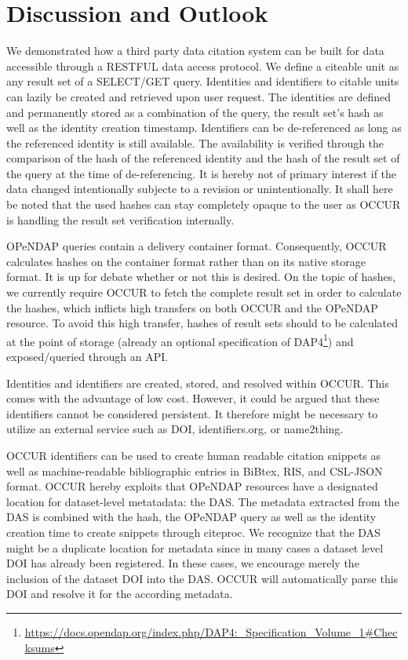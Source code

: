 \documentclass[letterpaper, twocolumn, parskip=half, fontsize=8pt, DIV=calc]{scrartcl}
\begin{document}
\section{Discussion and Outlook}
We demonstrated how a third party data citation system can be built for data accessible through a RESTFUL data access protocol. 
We define a citeable unit as any result set of a SELECT/GET query. 
Identities and identifiers to citable units can lazily be created and retrieved upon user request. 
The identities are defined and permanently stored as a combination of the query, the result set's hash as well as the identity creation timestamp.
Identifiers can be de-referenced as long as the referenced identity is still available.
The availability is verified through the comparison of the hash of the referenced identity and the hash of the result set of the query at the time of de-referencing. It is hereby not of primary interest if the data changed intentionally subjecte to a revision or unintentionally. It shall here be noted that the used hashes can stay completely opaque to the user as OCCUR is handling the result set verification internally. 

OPeNDAP queries contain a delivery container format. Consequently, OCCUR calculates hashes on the container format rather than on its native storage format. It is up for debate whether or not this is desired. On the topic of hashes, we currently require OCCUR to fetch the complete result set in order to calculate the hashes, which inflicts high transfers on both OCCUR and the OPeNDAP resource. To avoid this high transfer, hashes of result sets should to be calculated at the point of storage (already an optional specification of DAP4\footnote{\url{https://docs.opendap.org/index.php/DAP4:_Specification_Volume_1\#Checksums}}) and exposed/queried through an API.

Identities and identifiers are created, stored, and resolved within OCCUR. This comes with the advantage of low cost. However, it could be argued that these identifiers cannot be considered persistent. It therefore might be necessary to utilize an external service such as DOI, identifiers.org, or name2thing.

OCCUR identifiers can be used to create human readable citation snippets as well as machine-readable bibliographic entries in BiBtex, RIS, and CSL-JSON format. OCCUR hereby exploits that OPeNDAP resources have a designated location for dataset-level metatadata: the DAS. The metadata extracted from the DAS is combined with the hash, the OPeNDAP query as well as the identity creation time to create snippets through citeproc. We recognize that the DAS might be a duplicate location for metadata since in many cases a dataset level DOI has already been registered. In these cases, we encourage merely the inclusion of the dataset DOI into the DAS. OCCUR will automatically parse this DOI and resolve it for the according metadata. 
\end{document}
